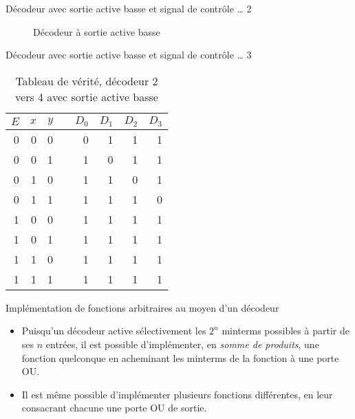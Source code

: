 \documentclass[presentation]{beamer}
\begin{document}
\begin{frame}[label={sec:org1beaadd}]{Décodeur avec sortie active basse et signal de contrôle \ldots{} 2}
\begin{figure}[htbp]
\centering

\caption{\label{fig:org07b5ade}Décodeur à sortie active basse}
\end{figure}
\end{frame}

\begin{frame}[label={sec:org6119f6a}]{Décodeur avec sortie active basse et signal de contrôle \ldots{} 3}
\begin{table}[htbp]
\caption{\label{tab:org3d1f5dc}Tableau de vérité, décodeur 2 vers 4 avec sortie active basse}
\centering
\begin{tabular}{rrrlrrrr}
\(E\) & \(x\) & \(y\) &  & \(D_0\) & \(D_1\) & \(D_2\) & \(D_3\)\\
\hline
0 & 0 & 0 &  & 0 & 1 & 1 & 1\\
0 & 0 & 1 &  & 1 & 0 & 1 & 1\\
0 & 1 & 0 &  & 1 & 1 & 0 & 1\\
0 & 1 & 1 &  & 1 & 1 & 1 & 0\\
1 & 0 & 0 &  & 1 & 1 & 1 & 1\\
1 & 0 & 1 &  & 1 & 1 & 1 & 1\\
1 & 1 & 0 &  & 1 & 1 & 1 & 1\\
1 & 1 & 1 &  & 1 & 1 & 1 & 1\\
\end{tabular}
\end{table}
\end{frame}


\begin{frame}[label={sec:org45b7360}]{Implémentation de fonctions arbitraires au moyen d'un décodeur}
\begin{itemize}
\item Puisqu'un décodeur active sélectivement les \(2^n\) minterms possibles à partir de ses \(n\) entrées, il est possible d'implémenter, en \emph{somme de produits}, une fonction quelconque en acheminant les minterms de la fonction à une porte OU.

\item Il est même possible d'implémenter plusieurs fonctions différentes, en leur consacrant chacune une porte OU de sortie.
\end{itemize}
\end{frame}
\end{document}
